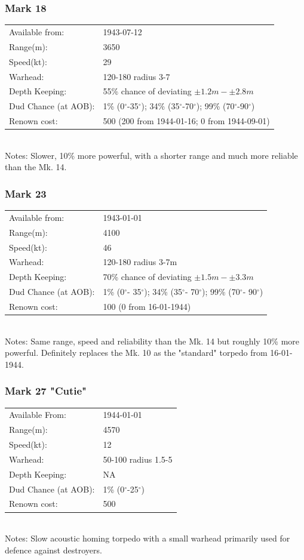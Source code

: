 \documentclass{article}
\newcommand{\degree}{$^{\circ}$}
\begin{document}
\subsubsection{Mark 18}
\begin{tabular}{l|l}
Available from:& 1943-07-12\\
Range(m):& 3650\\
Speed(kt):&29\\
Warhead:& 120-180 radius 3-7\\
Depth Keeping:& 55\% chance of deviating $\pm 1.2m - \pm 2.8m$\\
Dud Chance (at AOB):& 1\% (0\degree-35\degree); 34\% (35\degree-70\degree); 99\% (70\degree-90\degree)\\
Renown cost:&  500 (200 from 1944-01-16; 0 from 1944-09-01)\\
\end{tabular} \\
Notes: Slower, 10\% more powerful, with a shorter range and much more reliable than the Mk. 14.

\subsubsection{Mark 23}
\begin{tabular}{l|l}
Available from:& 1943-01-01\\
Range(m):& 4100\\
Speed(kt):&46\\
Warhead:& 120-180 radius 3-7m\\
Depth Keeping:& 70\% chance of deviating $\pm 1.5m - \pm 3.3m$\\
Dud Chance (at AOB):& 1\% (0\degree - 35\degree); 34\% (35\degree- 70\degree); 99\% (70\degree- 90\degree)\\
Renown cost:&  100 (0 from 16-01-1944)\\
\end{tabular} \\
Notes: Same range, speed and reliability than the Mk. 14 but roughly 10\% more powerful. Definitely replaces the Mk. 10 as the "standard" torpedo from 16-01-1944.

\subsubsection{Mark 27 "Cutie"}
\begin{tabular}{l|l}
Available From:& 1944-01-01\\
Range(m):& 4570\\
Speed(kt):&12\\
Warhead:& 50-100 radius 1.5-5\\
Depth Keeping:& NA\\
Dud Chance (at AOB):& 1\% (0\degree-25\degree)\\
Renown cost:& 500\\
\end{tabular} \\
Notes: Slow acoustic homing torpedo with a small warhead primarily used for defence against destroyers.
\end{document}
